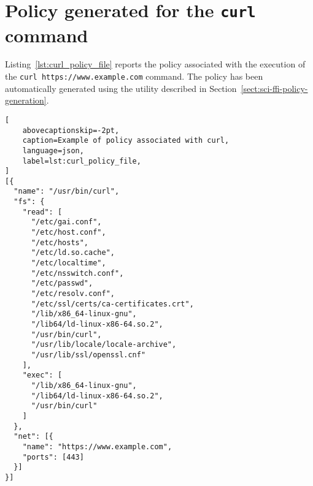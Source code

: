 \chapter{Policy generated for the \texttt{curl} command}\label{appendix:curl_policy}

\vspace{-0.2mm}
Listing~\ref{lst:curl_policy_file} reports the policy associated with
the execution of the {\tt curl https://www.example.com} command. The policy has
been automatically generated using the utility described in
Section~\ref{sect:sci-ffi-policy-generation}.

\begin{lstlisting}[
    abovecaptionskip=-2pt,
    caption=Example of policy associated with curl,
    language=json,
    label=lst:curl_policy_file,
]
[{
  "name": "/usr/bin/curl",
  "fs": {
    "read": [
      "/etc/gai.conf",
      "/etc/host.conf",
      "/etc/hosts",
      "/etc/ld.so.cache",
      "/etc/localtime",
      "/etc/nsswitch.conf",
      "/etc/passwd",
      "/etc/resolv.conf",
      "/etc/ssl/certs/ca-certificates.crt",
      "/lib/x86_64-linux-gnu",
      "/lib64/ld-linux-x86-64.so.2",
      "/usr/bin/curl",
      "/usr/lib/locale/locale-archive",
      "/usr/lib/ssl/openssl.cnf"
    ],
    "exec": [
      "/lib/x86_64-linux-gnu",
      "/lib64/ld-linux-x86-64.so.2",
      "/usr/bin/curl"
    ]
  },
  "net": [{
    "name": "https://www.example.com",
    "ports": [443]
  }]
}]
\end{lstlisting}
